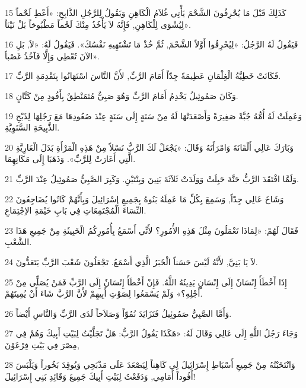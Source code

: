 \par 15 كَذَلِكَ قَبْلَ مَا يُحْرِقُونَ الشَّحْمَ يَأْتِي غُلاَمُ الْكَاهِنِ وَيَقُولُ لِلرَّجُلِ الذَّابِحِ: «أَعْطِ لَحْماً لِيُشْوَى لِلْكَاهِنِ, فَإِنَّهُ لاَ يَأْخُذُ مِنْكَ لَحْماً مَطْبُوخاً بَلْ نَيْئاً».
\par 16 فَيَقُولُ لَهُ الرَّجُلُ: «لِيُحْرِقُوا أَوَّلاً الشَّحْمَ, ثُمَّ خُذْ مَا تَشْتَهِيهِ نَفْسُكَ». فَيَقُولُ لَهُ: «لاَ, بَلِ الآنَ تُعْطِي وَإِلَّا فَآخُذُ غَصْباً».
\par 17 فَكَانَتْ خَطِيَّةُ الْغِلْمَانِ عَظِيمَةً جِدّاً أَمَامَ الرَّبِّ, لأَنَّ النَّاسَ اسْتَهَانُوا بِتَقْدِمَةِ الرَّبِّ.
\par 18 وَكَانَ صَمُوئِيلُ يَخْدِمُ أَمَامَ الرَّبِّ وَهُوَ صَبِيٌّ مُتَمَنْطِقٌ بِأَفُودٍ مِنْ كَتَّانٍ.
\par 19 وَعَمِلَتْ لَهُ أُمُّهُ جُبَّةً صَغِيرَةً وَأَصْعَدَتْهَا لَهُ مِنْ سَنَةٍ إِلَى سَنَةٍ عِنْدَ صُعُودِهَا مَعَ رَجُلِهَا لِذَبْحِ الذَّبِيحَةِ السَّنَوِيَّةِ.
\par 20 وَبَارَكَ عَالِي أَلْقَانَةَ وَامْرَأَتَهُ وَقَالَ: «يَجْعَلْ لَكَ الرَّبُّ نَسْلاً مِنْ هَذِهِ الْمَرْأَةِ بَدَلَ الْعَارِيَّةِ الَّتِي أَعَارَتْ لِلرَّبِّ». وَذَهَبَا إِلَى مَكَانِهِمَا.
\par 21 وَلَمَّا افْتَقَدَ الرَّبُّ حَنَّةَ حَبِلَتْ وَوَلَدَتْ ثَلاَثَةَ بَنِينَ وَبِنْتَيْنِ. وَكَبِرَ الصَّبِيُّ صَمُوئِيلُ عِنْدَ الرَّبِّ.
\par 22 وَشَاخَ عَالِي جِدّاً, وَسَمِعَ بِكُلِّ مَا عَمِلَهُ بَنُوهُ بِجَمِيعِ إِسْرَائِيلَ وَبِأَنَّهُمْ كَانُوا يُضَاجِعُونَ النِّسَاءَ الْمُجْتَمِعَاتِ فِي بَابِ خَيْمَةِ الاِجْتِمَاعِ.
\par 23 فَقَالَ لَهُمْ: «لِمَاذَا تَعْمَلُونَ مِثْلَ هَذِهِ الأُمُورِ؟ لأَنِّي أَسْمَعُ بِأُمُورِكُمُ الْخَبِيثَةِ مِنْ جَمِيعِ هَذَا الشَّعْبِ.
\par 24 لاَ يَا بَنِيَّ, لأَنَّهُ لَيْسَ حَسَناً الْخَبَرُ الَّذِي أَسْمَعُ. تَجْعَلُونَ شَعْبَ الرَّبِّ يَتَعَدُّونَ.
\par 25 إِذَا أَخْطَأَ إِنْسَانٌ إِلَى إِنْسَانٍ يَدِينُهُ اللَّهُ. فَإِنْ أَخْطَأَ إِنْسَانٌ إِلَى الرَّبِّ فَمَنْ يُصَلِّي مِنْ أَجْلِهِ؟» وَلَمْ يَسْمَعُوا لِصَوْتِ أَبِيهِمْ لأَنَّ الرَّبَّ شَاءَ أَنْ يُمِيتَهُمْ.
\par 26 وَأَمَّا الصَّبِيُّ صَمُوئِيلُ فَتَزَايَدَ نُمُوّاً وَصَلاَحاً لَدَى الرَّبِّ وَالنَّاسِ أَيْضاً.
\par 27 وَجَاءَ رَجُلُ اللَّهِ إِلَى عَالِي وَقَالَ لَهُ: «هَكَذَا يَقُولُ الرَّبُّ: هَلْ تَجَلَّيْتُ لِبَيْتِ أَبِيكَ وَهُمْ فِي مِصْرَ فِي بَيْتِ فِرْعَوْنَ,
\par 28 وَانْتَخَبْتُهُ مِنْ جَمِيعِ أَسْبَاطِ إِسْرَائِيلَ لِي كَاهِناً لِيَصْعَدَ عَلَى مَذْبَحِي وَيُوقِدَ بَخُوراً وَيَلْبَسَ أَفُوداً أَمَامِي, وَدَفَعْتُ لِبَيْتِ أَبِيكَ جَمِيعَ وَقَائِدِ بَنِي إِسْرَائِيلَ!
